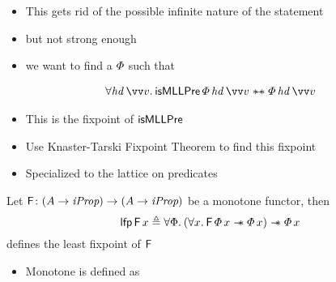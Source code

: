 \documentclass[thesis.tex]{subfiles}
\begin{document}
\begin{itemize}
    \item This gets rid of the possible infinite nature of the statement
    \item but not strong enough
    \item we want to find a $\varPhi$ such that
\end{itemize}
\begin{align*}
    \All \langv{hd}\, \vect{v}. \textlog{isMLLPre}\, \pred\, \langv{hd}\, \vect{v} \wandIff \pred\, \langv{hd}\, \vect{v}
\end{align*}
\begin{itemize}
    \item This is the fixpoint of $\textsf{\upshape isMLLPre}$
    \item Use Knaster-Tarski Fixpoint Theorem to find this fixpoint \cite*{tarskiLatticetheoreticalFixpointTheorem1955}
    \item Specialized to the lattice on predicates
\end{itemize}
\begin{theorem}
    \label{thm:tarski}
    Let $\textsf{\upshape F}\colon (A \to \textit{iProp}) \to (A \to \textit{iProp})$ be a monotone functor, then
    \[\lfp\, \hopred\, \var \eqdef \All \Phi. (\All \var. \hopred\, \pred\, \var \wand \pred\, \var) \wand \pred \, \var\]
    defines the least fixpoint of $\textsf{\upshape F}$
\end{theorem}
\begin{itemize}
    \item Monotone is defined as
\end{itemize}
\end{document}
